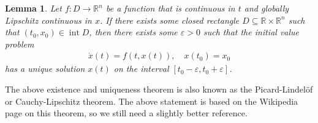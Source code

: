\documentclass[a4paper]{article}
\theoremstyle{definition}
\theoremstyle{plain}
\newtheorem{lemma}{Lemma\hspace{0.25em}\ignorespaces}
\DeclareMathOperator{\interior}{int}
\begin{document}
\begin{lemma}
  Let $f : D \rightarrow \mathbb{R}^{n}$ be a function that is continuous in $t$
  and globally Lipschitz continuous in $x$. If there exists some closed
  rectangle $D \subseteq \mathbb{R} \times \mathbb{R}^{n}$ such that
  $(t_{0}, x_{0}) \in \interior D$, then there exists some $\varepsilon > 0$
  such that the initial value problem
  \begin{align}
    \label{eq:1}
    \dot{x}(t) = f(t, x(t)), \quad x(t_{0}) = x_{0}
  \end{align}
  has a unique solution $x(t)$ on the interval
  $[t_{0} - \varepsilon, t_{0} + \varepsilon]$.
\end{lemma}

{\color{Navy} The above existence and uniqueness theorem is also known as the
  Picard-Lindel{\"o}f or Cauchy-Lipschitz theorem. The above statement is based
  on the Wikipedia page on this theorem, so we still need a slightly better
  reference.}
\end{document}
